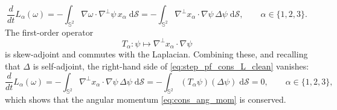 \documentclass{amsart}
\begin{document}
\begin{equation}
    \frac{d}{dt}L_\alpha(\omega) 
    = -\int_{\mathbb{S}^2} \nabla \omega \cdot \nabla^\perp \psi \, x_\alpha \; \mathrm{d}\mathcal{S} 
    = -\int_{\mathbb{S}^2} \nabla^\perp x_\alpha \cdot \nabla \psi \,\Delta \psi \; \mathrm{d}\mathcal{S},
    \qquad \alpha \in \{1,2,3\}.
    \label{eq:step_pf_cons_L_clean}
\end{equation}
The first-order operator
\[
T_\alpha : \psi \mapsto \nabla^\perp x_\alpha \cdot \nabla \psi
\]
is skew-adjoint and commutes with the Laplacian. Combining these, and recalling that $\Delta$ is self-adjoint, the right-hand side of \eqref{eq:step_pf_cons_L_clean} vanishes:
\[
\frac{d}{dt}L_\alpha(\omega)=-\int_{\mathbb{S}^2} \nabla^\perp x_\alpha \cdot \nabla \psi \, \Delta \psi \; \mathrm{d}\mathcal{S}
= -\int_{\mathbb{S}^2} (T_\alpha \psi)(\Delta \psi) \; \mathrm{d}\mathcal{S}
= 0, \qquad \alpha \in \{1,2,3\},
\]
which shows that the angular momentum \eqref{eq:cons_ang_mom} is conserved. 
\end{document}
